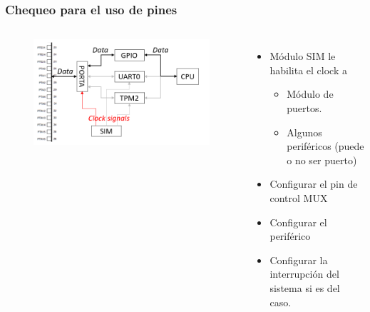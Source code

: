 \documentclass[10.5pt,scale=1.0,t,aspectratio=169,hyperref={pdfpagelabels=false}]{beamer}
\begin{document}
\begin{frame}
	\frametitle{Chequeo para el uso de pines}
	\begin{columns}
		\begin{figure}
			\centering
			\includegraphics[scale=0.5]{14_ChequeoPines}
		\end{figure}
		
		
		\begin{itemize}
			\item Módulo SIM le habilita el clock a
			\begin{itemize}
				\item Módulo de puertos.
				\item Algunos periféricos (puede o no ser puerto)
			\end{itemize}
			\item Configurar el pin de control MUX
			\item Configurar el periférico
			\item Configurar la interrupción del sistema si es del caso. 
		\end{itemize}
	\end{columns}
\end{frame}
\end{document}
